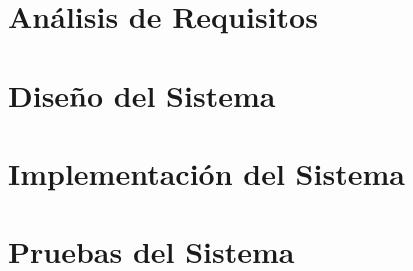 \documentclass[a4paper,11pt]{book}
\begin{document}


\chapter{Análisis de Requisitos}


\chapter{Diseño del Sistema}


\chapter{Implementación del Sistema}


\chapter{Pruebas del Sistema}


\end{document}
